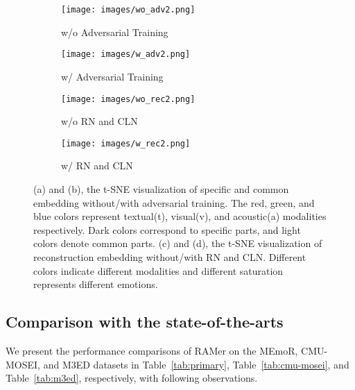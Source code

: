 \begin{figure*}[thb]
    \centering
    \begin{subfigure}[b]{0.2\textwidth}
        \centering
        \texttt{[image: images/wo\_adv2.png]}
        \caption{w/o Adversarial Training}
        \label{fig:top-left}
    \end{subfigure}
    \hspace{0.02\textwidth}
    \begin{subfigure}[b]{0.2\textwidth}
        \centering
        \texttt{[image: images/w\_adv2.png]}
        \caption{w/ Adversarial Training}
        \label{fig:top-right}
    \end{subfigure}
    \hspace{0.02\textwidth} 
    \begin{subfigure}[b]{0.2\textwidth}
        \centering
        \texttt{[image: images/wo\_rec2.png]}
        \caption{w/o RN and CLN}
        \label{fig:bottom-left}
    \end{subfigure}
    \hspace{0.02\textwidth}
    \begin{subfigure}[b]{0.2\textwidth}
        \centering
        \texttt{[image: images/w\_rec2.png]}
        \caption{w/ RN and CLN}
        \label{fig:bottom_right}
    \end{subfigure}
    \vspace{-.5em}
    \caption{(a) and (b), the t-SNE visualization of specific and common embedding without/with adversarial training. The red, green, and blue colors represent textual(t), visual(v), and acoustic(a) modalities respectively. Dark colors correspond to specific parts, and light colors denote common parts. (c) and (d), the t-SNE visualization of reconstruction embedding without/with RN and CLN. Different colors indicate different modalities and different saturation represents different emotions.}
    \label{fig:tsne}
    \vspace{-1em}
\end{figure*}

\subsection{Comparison with the state-of-the-arts}
We present the performance comparisons of RAMer on the MEmoR, CMU-MOSEI, and M3ED datasets in Table~\ref{tab:primary}, Table~\ref{tab:cmu-mosei}, and Table~\ref{tab:m3ed}, respectively, with following observations.

